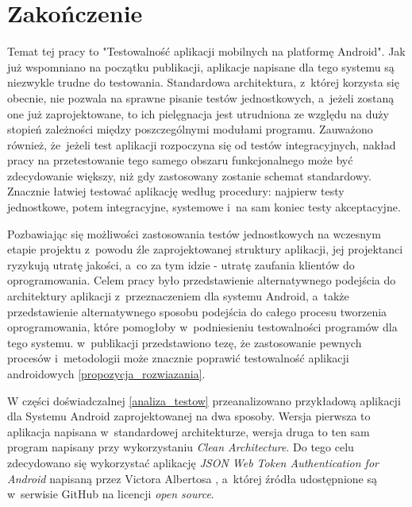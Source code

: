 \chapter*{Zakończenie}
\label{zakonczenie}

Temat tej pracy to "Testowalność aplikacji mobilnych na platformę Android". Jak już wspomniano na początku publikacji, aplikacje napisane dla tego systemu są niezwykle trudne do testowania. Standardowa architektura, z~której korzysta się obecnie, nie pozwala na sprawne pisanie testów jednostkowych, a~jeżeli zostaną one już zaprojektowane, to ich pielęgnacja jest utrudniona ze względu na duży stopień zależności między poszczególnymi modułami programu. Zauważono również, że~jeżeli test aplikacji rozpoczyna się od testów integracyjnych, nakład pracy na przetestowanie tego samego obszaru funkcjonalnego może być zdecydowanie większy, niż gdy zastosowany zostanie schemat standardowy. Znacznie łatwiej testować aplikację według procedury: najpierw testy jednostkowe, potem integracyjne, systemowe i~na sam koniec testy akceptacyjne. 

Pozbawiając się możliwości zastosowania testów jednostkowych na wczesnym etapie projektu z~powodu źle zaprojektowanej struktury aplikacji, jej projektanci ryzykują utratę jakości, a~co za tym idzie - utratę zaufania klientów do oprogramowania. Celem pracy było przedstawienie alternatywnego podejścia do architektury aplikacji z~przeznaczeniem dla systemu Android, a~także przedstawienie alternatywnego sposobu podejścia do całego procesu tworzenia oprogramowania, które pomogłoby w~podniesieniu testowalności programów dla tego systemu. w~publikacji przedstawiono tezę, że zastosowanie pewnych procesów i~metodologii może znacznie poprawić testowalność aplikacji androidowych \ref{propozycja_rozwiazania}.

W części doświadczalnej \ref{analiza_testow} przeanalizowano przykładową aplikacji dla Systemu Android zaprojektowanej na dwa sposoby. Wersja pierwsza to aplikacja napisana w~standardowej architekturze, wersja druga to ten sam program napisany przy wykorzystaniu \textit{Clean Architecture}. Do tego celu zdecydowano się wykorzystać
aplikację \textit{JSON Web Token Authentication for Android} napisaną przez Victora Albertosa \cite{website:victor:aplication} , a~której źródła udostępnione są w~serwisie GitHub na licencji \textit{open source}.

